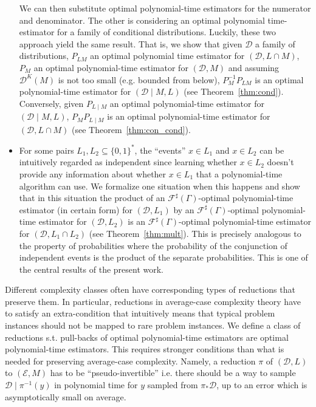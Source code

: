 \documentclass{article}
\numberwithin{equation}{section}
\theoremstyle{definition}
\theoremstyle{plain}
\newcommand{\Bool}{\{0,1\}}
\newcommand{\Words}{{\Bool^*}}
\newcommand{\Dist}{\mathcal{D}}
\newcommand{\Fall}{\mathcal{F}}
\newcommand{\ESG}{\Fall^\sharp(\Gamma)}
\begin{document}
\begin{itemize}
We can then substitute optimal polynomial-time estimators for the numerator and denominator. The other is considering an optimal polynomial time-estimator for a family of conditional distributions. Luckily, these two approach yield the same result. That is, we show that given ${\Dist}$ a family of distributions, ${P_{LM}}$ an optimal polynomial time estimator for ${(\Dist,L \cap M)}$, ${P_M}$ an optimal polynomial-time estimator for ${(\Dist,M)}$ and assuming ${\Dist^K(M)}$ is not too small (e.g. bounded from below), ${P_M^{-1}P_{LM}}$ is an optimal polynomial-time estimator for ${(\Dist \mid M, L)}$ (see Theorem~\ref{thm:cond}). Conversely, given ${P_{L \mid M}}$ an optimal polynomial-time estimator for ${(\Dist \mid M, L)}$, ${P_M P_{L \mid M}}$ is an optimal polynomial-time estimator for ${(\Dist, L \cap M)}$ (see Theorem~\ref{thm:con_cond}).
\item
For some pairs ${L_1, L_2 \subseteq \Words}$, the \enquote{events} ${x \in L_1}$ and ${x \in L_2}$ can be intuitively regarded as independent since learning whether ${x \in L_2}$ doesn't provide any information about whether ${x \in L_1}$ that a polynomial-time algorithm can use. We formalize one situation when this happens and show that in this situation the product of an ${\ESG}$-optimal polynomial-time estimator (in certain form) for ${(\Dist,L_1)}$ by an ${\ESG}$-optimal polynomial-time estimator for ${(\Dist,L_2)}$ is an ${\ESG}$-optimal polynomial-time estimator for ${(\Dist, L_1 \cap L_2)}$ (see Theorem~\ref{thm:mult}). This is precisely analogous to the property of probabilities where the probability of the conjunction of independent events is the product of the separate probabilities. This is one of the central results of the present work.
\end{itemize}

Different complexity classes often have corresponding types of reductions that preserve them. In particular, reductions in average-case complexity theory have to satisfy an extra-condition that intuitively means that typical problem instances should not be mapped to rare problem instances. We define a class of reductions s.t. pull-backs of optimal polynomial-time estimators are optimal polynomial-time estimators. This requires stronger conditions than what is needed for preserving average-case complexity. Namely, a reduction ${\pi}$ of ${(\Dist,L)}$ to ${(\mathcal{E},M)}$ has to be \enquote{pseudo-invertible} i.e. there should be a way to sample ${\Dist \mid \pi^{-1}(y)}$ in polynomial time for ${y}$ sampled from ${\pi_* \Dist}$, up to an error which is asymptotically small on average. 
\end{document}
